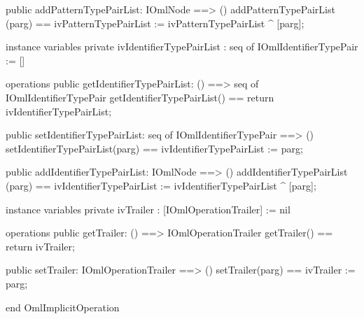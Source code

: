 \begin{vdm_al}
  public addPatternTypePairList: IOmlNode ==> ()
  addPatternTypePairList (parg) == ivPatternTypePairList := ivPatternTypePairList ^ [parg];

instance variables
  private ivIdentifierTypePairList : seq of IOmlIdentifierTypePair := []

operations
  public getIdentifierTypePairList: () ==> seq of IOmlIdentifierTypePair
  getIdentifierTypePairList() == return ivIdentifierTypePairList;

  public setIdentifierTypePairList: seq of IOmlIdentifierTypePair ==> ()
  setIdentifierTypePairList(parg) == ivIdentifierTypePairList := parg;

  public addIdentifierTypePairList: IOmlNode ==> ()
  addIdentifierTypePairList (parg) == ivIdentifierTypePairList := ivIdentifierTypePairList ^ [parg];

instance variables
  private ivTrailer : [IOmlOperationTrailer] := nil

operations
  public getTrailer: () ==> IOmlOperationTrailer
  getTrailer() == return ivTrailer;

  public setTrailer: IOmlOperationTrailer ==> ()
  setTrailer(parg) == ivTrailer := parg;

end OmlImplicitOperation
\end{vdm_al}

